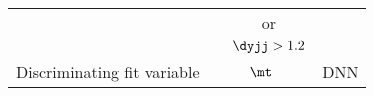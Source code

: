 \begin{tabular}{c|| c| c| c| c}
                           & \multicolumn{2}{c|}{ } & or & \\
                           & \multicolumn{2}{c|}{ } & $\dyjj > 1.2$ & \\
 \midrule
Discriminating fit variable   & \multicolumn{3}{c|}{$\mt$}    & DNN   \\
  \bottomrule
  \end{tabular}
